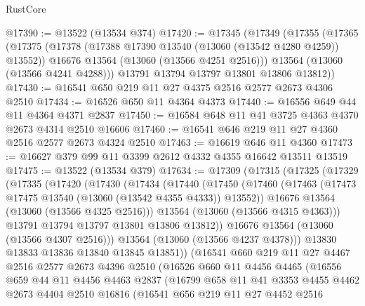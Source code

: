 \begin{lexlean}{RustCore}
\begin{coremodule}
@17390 := @13522 (@13534 @374)
@17420 := @17345
    (@17349
      (@17355
        (@17365
          (@17375
            (@17378 (@17388 @17390 @13540 (@13060 (@13542 @4280 @4259)) @13552))
            @16676
            @13564
            (@13060 (@13566 @4251 @2516)))
          @13564
          (@13060 (@13566 @4241 @4288)))
        @13791
        @13794
        @13797
        @13801
        @13806
        @13812))
@17430 := @16541 @650 @219 @11 @27 @4375 @2516 @2577 @2673 @4306 @2510
@17434 := @16526 @650 @11 @4364 @4373
@17440 := @16556 @649 @44 @11 @4364 @4371 @2837
@17450 := @16584 @648 @11 @41 @3725 @4363 @4370 @2673 @4314 @2510 @16606
@17460 := @16541 @646 @219 @11 @27 @4360 @2516 @2577 @2673 @4324 @2510
@17463 := @16619 @646 @11 @4360
@17473 := @16627 @379 @99 @11 @3399 @2612 @4332 @4355 @16642 @13511 @13519
@17475 := @13522 (@13534 @379)
@17634 := @17309
    (@17315
      (@17325
        (@17329
          (@17335
            (@17420
              (@17430
                (@17434
                  (@17440
                    (@17450
                      (@17460
                        (@17463 (@17473 @17475 @13540 (@13060 (@13542 @4355 @4333)) @13552))
                        @16676
                        @13564
                        (@13060 (@13566 @4325 @2516)))
                      @13564
                      (@13060 (@13566 @4315 @4363)))
                    @13791
                    @13794
                    @13797
                    @13801
                    @13806
                    @13812))
                @16676
                @13564
                (@13060 (@13566 @4307 @2516)))
              @13564
              (@13060 (@13566 @4237 @4378)))
            @13830
            @13833
            @13836
            @13840
            @13845
            @13851))
        (@16541
          @660
          @219
          @11
          @27
          @4467
          @2516
          @2577
          @2673
          @4396
          @2510
          (@16526
            @660
            @11
            @4456
            @4465
            (@16556
              @659
              @44
              @11
              @4456
              @4463
              @2837
              (@16799
                @658
                @11
                @41
                @3353
                @4455
                @4462
                @2673
                @4404
                @2510
                @16816
                (@16541
                  @656
                  @219
                  @11
                  @27
                  @4452
                  @2516

\end{coremodule}
\end{lexlean}
